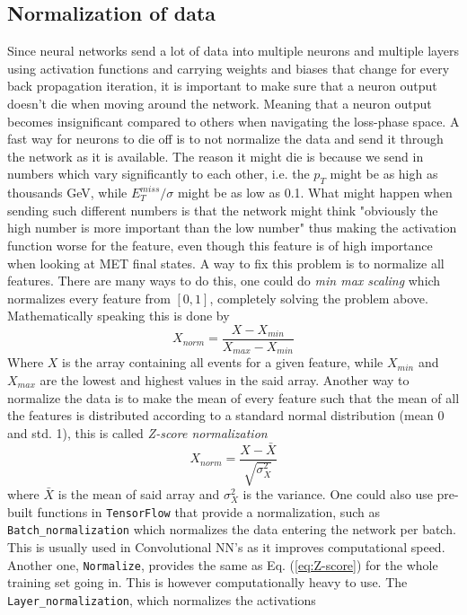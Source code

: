 \documentclass[12pt, a4paper]{book}
\begin{document}
\subsection{Normalization of data}\label{sec:normie_NN}
Since neural networks send a lot of data into multiple neurons and multiple layers using activation functions and carrying weights and biases that change 
for every back propagation iteration, it is important to make sure that a neuron output doesn't die when moving around the network. Meaning that a neuron output becomes insignificant compared to others when navigating the loss-phase space.
A fast way for neurons to die off is to not normalize the data and send it through the network as it is available. The reason it might die is because we send in numbers which vary significantly to each other, i.e. the $p_{T}$ might be as high as thousands GeV, while 
$E_T^{miss}/\sigma$ might be as low as 0.1. What might happen when sending such different numbers is that the network might think "obviously the high number is more important than the low number" thus making the activation function worse for the feature, even though 
this feature is of high importance when looking at MET final states. A way to fix this problem is to normalize all features. There are many ways to do this, one could do \textit{min max scaling} which normalizes every feature from $[0,1]$, completely solving the problem above. 
Mathematically speaking this is done by
\begin{equation}\label{eq:minmax}
   X_{norm} = \frac{X - X_{min}}{X_{max}-X_{min}}
\end{equation}
Where $X$ is the array containing all events for a given feature, while $X_{min}$ and $X_{max}$ are the lowest and highest values in the said array. Another way to normalize the data is to make the mean of every feature such that the mean of all the features is distributed according 
to a standard normal distribution (mean 0 and std. 1), this is called \textit{Z-score normalization}
\begin{equation}\label{eq:Z-score}
   X_{norm} = \frac{X - \bar{X}}{\sqrt{\sigma_X^2}}
\end{equation}
where $\bar{X}$ is the mean of said array and $\sigma_X^2$ is the variance. One could also use pre-built functions in \verb|TensorFlow| that provide a normalization, such as \verb|Batch_normalization| which normalizes the data entering the network per batch. This is usually used 
in Convolutional NN's as it improves computational speed. Another one, \verb|Normalize|, provides the same as Eq. (\ref{eq:Z-score}) for the whole training set going in. This is however computationally heavy to use. The \verb|Layer_normalization|, which normalizes the activations 
\end{document}

